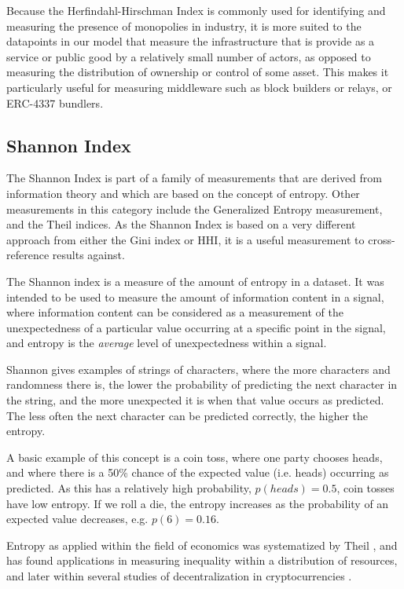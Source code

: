\documentclass[conference]{IEEEtran}
\begin{document}
\vspace{8pt}

Because the Herfindahl-Hirschman Index is commonly used for identifying and measuring the presence of monopolies in industry, it is more suited to the datapoints in our model that measure the infrastructure that is provide as a service or public good by a relatively small number of actors, as opposed to measuring the distribution of ownership or control of some asset.  This makes it particularly useful for measuring middleware such as block builders or relays, or ERC-4337 bundlers.

\subsection{Shannon Index}

The Shannon Index \cite{shannon1998mathematical} is part of a family of measurements that are derived from information theory and which are based on the concept of entropy.  Other measurements in this category include the Generalized Entropy measurement, and the Theil indices.  As the Shannon Index is based on a very different approach from either the Gini index or HHI, it is a useful measurement to cross-reference results against.

The Shannon index is a measure of the amount of entropy in a dataset.  It was intended to be used to measure the amount of information content in a signal, where information content can be considered as a measurement of the unexpectedness of a particular value occurring at a specific point in the signal, and entropy is the \textit{average} level of unexpectedness within a signal.  

Shannon gives examples of strings of characters, where the more characters and randomness there is, the lower the probability of predicting the next character in the string, and the more unexpected it is when that value occurs as predicted.  The less often the next character can be predicted correctly, the higher the entropy.

A basic example of this concept is a coin toss, where one party chooses heads, and where there is a 50\% chance of the expected value (i.e. heads) occurring as predicted.  As this has a relatively high probability, $p(heads) = 0.5$, coin tosses have low entropy. If we roll a die, the entropy increases as the probability of an expected value decreases, e.g. $p(6) = 0.16$.

Entropy as applied within the field of economics was systematized by Theil \cite{theil1967economics}, and has found applications in measuring inequality within a distribution of resources, and later within several studies of decentralization in cryptocurrencies \cite{zhang2022sok, gochhayat2020measuring, kusmierz2022centralized}.
\end{document}
